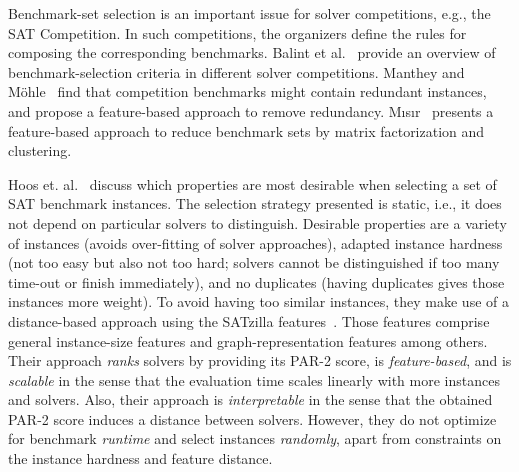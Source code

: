 \documentclass[runningheads]{llncs}
\begin{document}
Benchmark-set selection is an important issue for solver competitions, e.g., the SAT Competition.
In such competitions, the organizers define the rules for composing the corresponding benchmarks.
Balint et al.~\cite{balint2015overview} provide an overview of benchmark-selection criteria in different solver competitions.
Manthey and Möhle~\cite{manthey2016better} find that competition benchmarks might contain redundant instances, and propose a feature-based approach to remove redundancy.
M{\i}s{\i}r~\cite{misir2021benchmark} presents a feature-based approach to reduce benchmark sets by matrix factorization and clustering.

Hoos et. al.~\cite{HoosKSS13} discuss which properties are most desirable when selecting a set of SAT benchmark instances.
The selection strategy presented is static, i.e., it does not depend on particular solvers to distinguish.
Desirable properties are a variety of instances (avoids over-fitting of solver approaches), adapted instance hardness (not too easy but also not too hard; solvers cannot be distinguished if too many time-out or finish immediately), and no duplicates (having duplicates gives those instances more weight).
To avoid having too similar instances, they make use of a distance-based approach using the SATzilla features~\cite{XuHHL08,features}.
Those features comprise general instance-size features and graph-representation features among others.
Their approach \emph{ranks} solvers by providing its PAR-2 score, is \emph{feature-based}, and is \emph{scalable} in the sense that the evaluation time scales linearly with more instances and solvers.
Also, their approach is \emph{interpretable} in the sense that the obtained PAR-2 score induces a distance between solvers.
However, they do not optimize for benchmark \emph{runtime} and select instances \emph{randomly}, apart from constraints on the instance hardness and feature distance.

\end{document}
